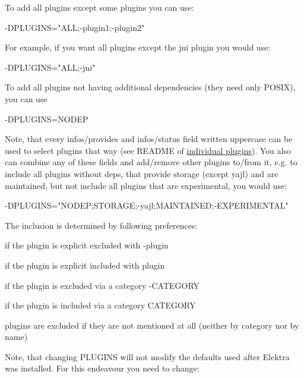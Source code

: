 To add all plugins except some plugins you can use\+:


\begin{DoxyCode}
-DPLUGINS="ALL;-plugin1;-plugin2"
\end{DoxyCode}


For example, if you want all plugins except the jni plugin you would use\+:


\begin{DoxyCode}
-DPLUGINS="ALL;-jni"
\end{DoxyCode}


To add all plugins not having additional dependencies (they need only P\+O\+S\+IX), you can use


\begin{DoxyCode}
-DPLUGINS=NODEP
\end{DoxyCode}


Note, that every {\ttfamily infos/provides} and {\ttfamily infos/status} field written uppercase can be used to select plugins that way (see R\+E\+A\+D\+ME of \hyperlink{src_plugins_README_md}{individual plugins}). You also can combine any of these fields and add/remove other plugins to/from it, e.\+g. to include all plugins without deps, that provide storage (except {\ttfamily yajl}) and are maintained, but not include all plugins that are experimental, you would use\+:


\begin{DoxyCode}
-DPLUGINS="NODEP;STORAGE;-yajl;MAINTAINED;-EXPERIMENTAL"
\end{DoxyCode}


The inclusion is determined by following preferences\+:


\begin{DoxyEnumerate}
\item if the plugin is explicit excluded with {\ttfamily -\/plugin}
\item if the plugin is explicit included with {\ttfamily plugin}
\item if the plugin is excluded via a category {\ttfamily -\/\+C\+A\+T\+E\+G\+O\+RY}
\item if the plugin is included via a category {\ttfamily C\+A\+T\+E\+G\+O\+RY}
\item plugins are excluded if they are not mentioned at all (neither by category nor by name)
\end{DoxyEnumerate}

Note, that changing {\ttfamily P\+L\+U\+G\+I\+NS} will not modify the defaults used after Elektra was installed. For this endeavour you need to change\+:


